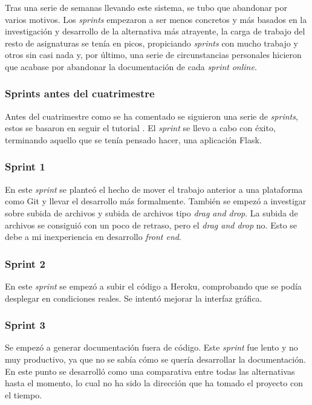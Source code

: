 Tras una serie de semanas llevando este sistema, se tubo que abandonar por varios motivos. Los \emph{sprints} empezaron a ser menos concretos y más basados en la investigación y desarrollo de la alternativa más atrayente, la carga de trabajo del resto de asignaturas se tenía en picos, propiciando \emph{sprints} con mucho trabajo y otros sin casi nada y, por último, una serie de circunstancias personales hicieron que acabase por abandonar la documentación de cada \emph{sprint} \emph{online}.

\subsubsection{Sprints antes del cuatrimestre}
Antes del cuatrimestre como se ha comentado se siguieron una serie de \emph{sprints}, estos se basaron en seguir el tutorial . El \emph{sprint} se llevo a cabo con éxito, terminando aquello que se tenía pensado hacer, una aplicación Flask.

\subsubsection{Sprint 1}
En este \emph{sprint} se planteó el hecho de mover el trabajo anterior a una plataforma como Git y llevar el desarrollo más formalmente. También se empezó a investigar sobre subida de archivos y subida de archivos tipo \emph{drag and drop}. La subida de archivos se consiguió con un poco de retraso, pero el \emph{drag and drop} no. Esto se debe a mi inexperiencia en desarrollo \emph{front end}.


\subsubsection{Sprint 2}
En este \emph{sprint} se empezó a subir el código a Heroku, comprobando que se podía desplegar en condiciones reales. Se intentó mejorar la interfaz gráfica.

\subsubsection{Sprint 3}
Se empezó a generar documentación fuera de código. Este \emph{sprint} fue lento y no muy productivo, ya que no se sabía cómo se quería desarrollar la documentación. En este punto se desarrolló como una comparativa entre todas las alternativas hasta el momento, lo cual no ha sido la dirección que ha tomado el proyecto con el tiempo.

